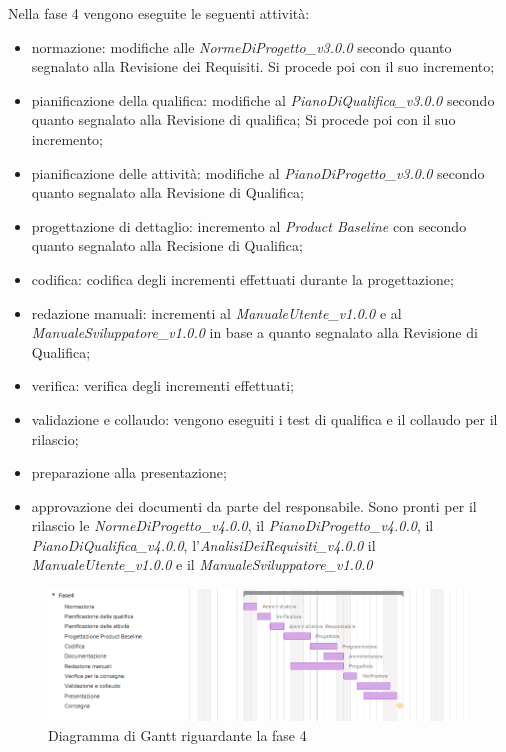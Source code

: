 Nella fase 4 vengono eseguite le seguenti attività:
\begin{itemize}
	\item normazione: modifiche alle \textit{NormeDiProgetto\_v3.0.0} secondo quanto segnalato alla Revisione dei Requisiti. Si procede poi con il suo incremento;
	\item pianificazione della qualifica: modifiche al \textit{PianoDiQualifica\_v3.0.0} secondo quanto segnalato alla Revisione di qualifica; Si procede poi con il suo incremento;
	\item pianificazione delle attività: modifiche al \textit{PianoDiProgetto\_v3.0.0} secondo quanto segnalato alla Revisione di Qualifica;
	\item progettazione di dettaglio: incremento al \textit{Product Baseline} con secondo quanto segnalato alla Recisione di Qualifica;
	\item codifica: codifica degli incrementi effettuati durante la progettazione;
	\item redazione manuali: incrementi al \textit{ManualeUtente\_v1.0.0} e al \textit{ManualeSviluppatore\_v1.0.0} in base a quanto segnalato alla Revisione di Qualifica;
	\item verifica: verifica degli incrementi effettuati;
	\item validazione e collaudo: vengono eseguiti i test di qualifica e il collaudo per il rilascio;
	\item preparazione alla presentazione;
	\item approvazione dei documenti da parte del responsabile. Sono pronti per il rilascio le \textit{NormeDiProgetto\_v4.0.0}, il \textit{PianoDiProgetto\_v4.0.0}, il \textit{PianoDiQualifica\_v4.0.0}, l'\textit{AnalisiDeiRequisiti\_v4.0.0} il
	\textit{ManualeUtente\_v1.0.0} e il \textit{ManualeSviluppatore\_v1.0.0}
\end{itemize}

\begin{figure}[h]
	\centering
	\includegraphics[scale=0.70]{images/fase4.png}
	\caption{Diagramma di Gantt riguardante la fase 4}
\end{figure}